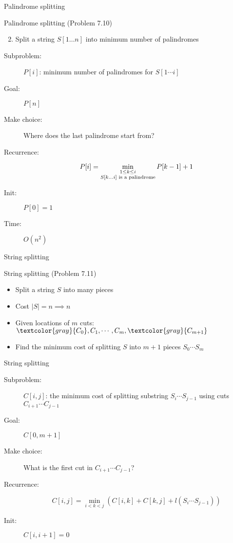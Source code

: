 \begin{frame}{Palindrome splitting}
  \begin{exampleblock}{Palindrome splitting (Problem 7.10)}
	\begin{enumerate}[(1)]
	  \setcounter{enumi}{1}
	  \item Split a string $S[1 \dots n]$ into minimum number of palindromes
    \end{enumerate}
  \end{exampleblock}

  \begin{description}
	\item[Subproblem:] $P[i]$: minimum number of palindromes for $S[1 \cdots i]$
	\item[Goal:] $P[n]$
	  \pause
	\item[Make choice:] Where does the last palindrome start from?
	\item[Recurrence:] 
	  \[
		P[i] = \min_{\begin{subarray}{c}
			1 \le k \le i \\
			S[k \dots i] \text{ is a palindrome}
		  \end{subarray}} P[k-1] + 1
	  \]
	  \pause
	\item[Init:] $P[0] = 1$
	\item[Time:] $O(n^2)$
  \end{description}
\end{frame}
\begin{frame}{String splitting}
  \begin{exampleblock}{String splitting (Problem 7.11)}
    \begin{itemize}
      \item Split a string $S$ into many pieces
      \item Cost $|S| = n \implies n$
      \item Given locations of $m$ cuts: $\textcolor{gray}{C_{0}}, C_{1}, \cdots, C_{m}, \textcolor{gray}{C_{m+1}}$
      \item Find the minimum cost of splitting $S$ into $m+1$ pieces $S_{0} \cdots S_{m}$
    \end{itemize}
  \end{exampleblock}
\end{frame}
\begin{frame}{String splitting}
  \begin{description}
	\item[Subproblem:] $C[i,j]$: the minimum cost of splitting substring $S_{i} \cdots S_{j-1}$ using cuts $C_{i+1} \cdots C_{j-1}$
	\item[Goal:] $C[0,m+1]$
	  \pause
	\item[Make choice:] What is the first cut in $C_{i+1} \cdots C_{j-1}$?
	\item[Recurrence:] 
	  \[
		C[i,j] = \min_{i < k < j} \left(C[i,k] + C[k,j] + l(S_{i} \cdots S_{j-1}) \right)
	  \]
	  \pause
	\item[Init:] $C[i, i+1] = 0$
  \end{description}
\end{frame}
